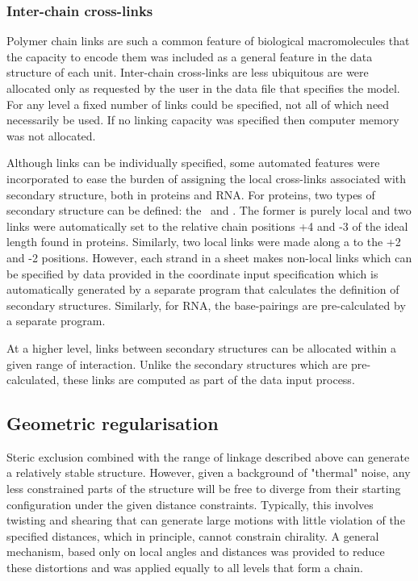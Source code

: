 \subsubsection{Inter-chain cross-links}

Polymer chain links are such a common feature of biological macromolecules that
the capacity to encode them was included as a general feature in the data structure
of each unit.   Inter-chain cross-links are less ubiquitous are were allocated
only as requested by the user in the data file that specifies the model.  For any
level a fixed number of links could be specified, not all of which need necessarily
be used.   If no linking capacity was specified then computer memory was not
allocated.

Although links can be individually specified, some automated features were 
incorporated to ease the burden of assigning the local cross-links associated with
secondary structure, both in proteins and RNA.  For proteins, two types of secondary
structure can be defined: the \AH\ and \BS.   The former is purely local and two
links were automatically set to the relative chain positions +4 and -3 of the 
ideal length found in proteins.  Similarly, two local links were made along a \Bs
to the +2 and -2 positions.   However, each strand in a sheet makes non-local
links which can be specified by data provided in the coordinate input specification
which is automatically generated by a separate program that calculates the
definition of secondary structures.    Similarly, for RNA, the base-pairings are
pre-calculated by a separate program.

At a higher level, links between secondary structures can be allocated within a
given range of interaction.   Unlike the secondary structures which are pre-calculated,
these links are computed as part of the data input process.

\subsection{Geometric regularisation}

Steric exclusion combined with the range of linkage described above can generate a
relatively stable structure.   However, given a background of "thermal" noise, any
less constrained parts of the structure will be free to diverge from their starting
configuration under the given distance constraints.  Typically, this involves twisting
and shearing that can generate large motions with little violation of the specified
distances, which in principle, cannot constrain chirality.  A general mechanism,
based only on local angles and distances was provided to reduce these distortions
and was applied equally to all levels that form a chain.

